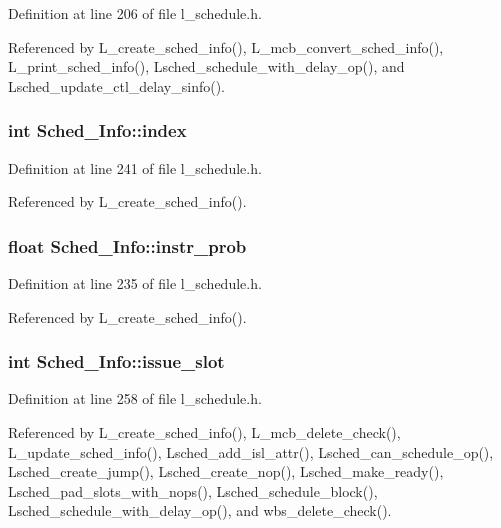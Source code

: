 Definition at line 206 of file l\_\-schedule.h.

Referenced by L\_\-create\_\-sched\_\-info(), L\_\-mcb\_\-convert\_\-sched\_\-info(), L\_\-print\_\-sched\_\-info(), Lsched\_\-schedule\_\-with\_\-delay\_\-op(), and Lsched\_\-update\_\-ctl\_\-delay\_\-sinfo().
\subsubsection{\setlength{\rightskip}{0pt plus 5cm}int \bf{Sched\_\-Info::index}}\label{structSched__Info_528ec4ffc5ff171ab6fc3ab5a9e7868c}




Definition at line 241 of file l\_\-schedule.h.

Referenced by L\_\-create\_\-sched\_\-info().
\subsubsection{\setlength{\rightskip}{0pt plus 5cm}float \bf{Sched\_\-Info::instr\_\-prob}}\label{structSched__Info_66c240cdff24f24bf052ed51613c0632}




Definition at line 235 of file l\_\-schedule.h.

Referenced by L\_\-create\_\-sched\_\-info().
\subsubsection{\setlength{\rightskip}{0pt plus 5cm}int \bf{Sched\_\-Info::issue\_\-slot}}\label{structSched__Info_80e67cf3c427308cc92215ff91a9b31c}




Definition at line 258 of file l\_\-schedule.h.

Referenced by L\_\-create\_\-sched\_\-info(), L\_\-mcb\_\-delete\_\-check(), L\_\-update\_\-sched\_\-info(), Lsched\_\-add\_\-isl\_\-attr(), Lsched\_\-can\_\-schedule\_\-op(), Lsched\_\-create\_\-jump(), Lsched\_\-create\_\-nop(), Lsched\_\-make\_\-ready(), Lsched\_\-pad\_\-slots\_\-with\_\-nops(), Lsched\_\-schedule\_\-block(), Lsched\_\-schedule\_\-with\_\-delay\_\-op(), and wbs\_\-delete\_\-check().
